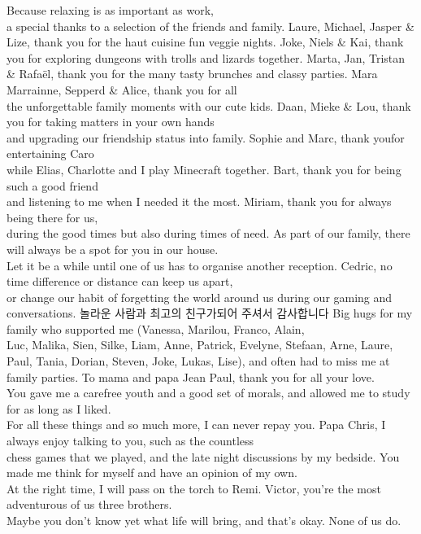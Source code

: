 Because relaxing is as important as work,\\a special thanks to a selection of the friends and family.
Laure, Michael, Jasper \& Lize, thank you for the haut cuisine fun veggie nights.
Joke, Niels \& Kai, thank you for exploring dungeons with trolls and lizards together.
Marta, Jan, Tristan \& Rafaël, thank you for the many tasty brunches and classy parties.
Mara Marrainne, Sepperd \& Alice, thank you for all\\the unforgettable family moments with our cute kids.
Daan, Mieke \& Lou, thank you for taking matters in your own hands\\and upgrading our friendship status into family.
Sophie and Marc, thank youfor entertaining Caro\\while Elias, Charlotte and I play Minecraft together. 
Bart, thank you for being such a good friend\\and listening to me when I needed it the most.
Miriam, thank you for always being there for us,\\during the good times but also during times of need.
As part of our family, there will always be a spot for you in our house.\\Let it be a while until one of us has to organise another reception.
Cedric, no time difference or distance can keep us apart,\\or change our habit of forgetting the world around us during our gaming and conversations. 
놀라운 사람과 최고의 친구가되어 주셔서 감사합니다
Big hugs for my family who supported me (Vanessa, Marilou, Franco, Alain,\\Luc, Malika, Sien, Silke, Liam, Anne, Patrick, Evelyne, Stefaan, Arne, Laure, 
Paul, Tania, Dorian, Steven, Joke, Lukas, Lise), and often had to miss me at family parties.
To mama and papa Jean Paul, thank you for all your love.\\You gave me a carefree youth and a good set of morals,
and allowed me to study for as long as I liked.\\For all these things and so much more, I can never repay you.
Papa Chris, I always enjoy talking to you, such as the countless\\chess games that we played, and the late night discussions by my bedside.
You made me think for myself and have an opinion of my own.\\At the right time, I will pass on the torch to Remi.
Victor, you're the most adventurous of us three brothers.\\Maybe you don't know yet what life will bring, and that's okay. None of us do.
